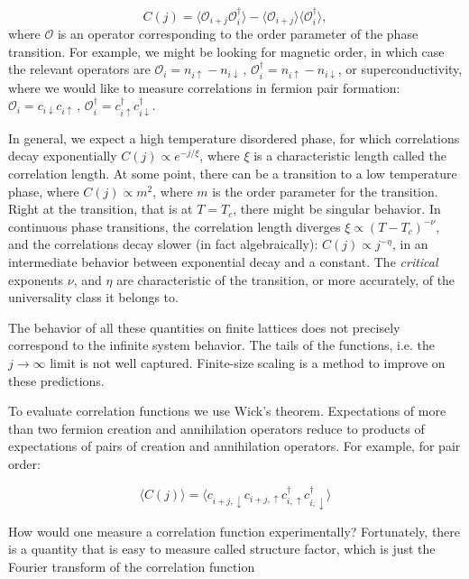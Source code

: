 \begin{equation}
C(j) = \big\langle \mathcal{O}_{i+j} \mathcal{O}_{i}^\dagger \big\rangle - \langle \mathcal{O}_{i+j} \big\rangle\big\langle\mathcal{O}_{i}^\dagger \big\rangle ,
\end{equation}
where $\mathcal{O}$ is an operator corresponding to the order parameter of the phase transition. For example, we might be looking for magnetic order, in which case the relevant operators are $\mathcal{O}_i = n_{i\uparrow} - n_{i\downarrow} \, , \, \mathcal{O}_i^\dagger = n_{i\uparrow} - n_{i\downarrow}$, or superconductivity, where we would like to measure correlations in fermion pair formation: $\mathcal{O}_i = c_{i\downarrow} c_{i\uparrow} \, , \, \mathcal{O}_i^\dagger = c_{i\uparrow}^\dagger c_{i\downarrow}^\dagger$.

In general, we expect a high temperature disordered phase, for which correlations decay exponentially $C(j) \propto e^{-j/\xi}$, where $\xi$ is a characteristic length called the correlation length. At some point, there can be a transition to a low temperature phase, where $C(j) \propto m^2$, where $m$ is the order parameter for the transition. Right at the transition, that is at $T = T_c$, there might be singular behavior. In continuous phase transitions, the correlation length diverges $\xi \propto (T-T_c)^{-\nu}$, and the correlations decay slower (in fact algebraically): $C(j) \propto j^{-\eta}$, in an intermediate behavior between exponential decay and a constant. The \emph{critical} exponents $\nu$, and $\eta$ are characteristic of the transition, or more accurately, of the universality class it belongs to.

The behavior of all these quantities on finite lattices does not precisely correspond to the infinite system behavior. The tails of the functions, i.e. the $j\rightarrow \infty$ limit is not well captured. Finite-size scaling is a method to improve on these predictions.

To evaluate correlation functions we use Wick's theorem. Expectations of more than two fermion creation and annihilation operators reduce to products of expectations of pairs of creation and annihilation operators. For example, for pair order:

\begin{equation}
\big\langle C(j) \big\rangle = \big\langle c_{i+j, \downarrow} c_{i+j, \uparrow} c_{i, \uparrow}^\dagger c_{i, \downarrow}^\dagger \big\rangle
\end{equation}

How would one measure a correlation function experimentally? Fortunately, there is a quantity that is easy to measure called structure factor, which is just the Fourier transform of the correlation function

